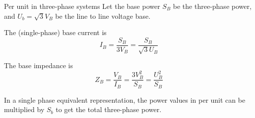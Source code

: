 \begin{frame}{Per unit in three-phase systems}
    Let the base power $S_B$ be the three-phase power, and $U_b=\sqrt{3}V_B$ be the line to line voltage base.

    The (single-phase) base current is $$I_B = \frac{S_B}{3V_B} = \frac{S_B}{\sqrt{3}U_B}$$

    The base impedance is $$Z_B = \frac{V_B}{I_B} = \frac{3V^2_B}{S_B} = \frac{U_B^2}{S_B}$$

    In a single phase equivalent representation, the power values in per unit can be multiplied by $S_b$ to get the total three-phase power.
\end{frame}
  